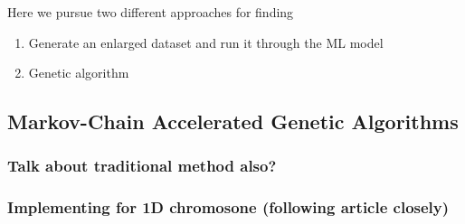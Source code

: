 Here we pursue two different approaches for finding 
\begin{enumerate}
  \item Generate an enlarged dataset and run it through the ML model 
  \item Genetic algorithm
\end{enumerate}


\subsection{Markov-Chain Accelerated Genetic Algorithms}

\subsubsection{Talk about traditional method also?}

\subsubsection{Implementing for 1D chromosone (following article closely)}

